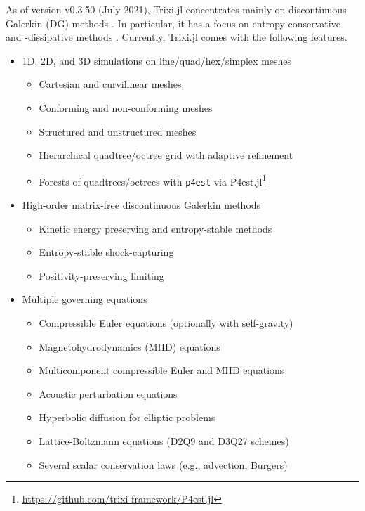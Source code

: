 \documentclass{juliacon}
\makeatletter
\newcommand{\eg}[0]{{e.g.\@}\xspace}
\newcommand{\trixi}{Trixi.jl\xspace}
\makeatother
\begin{document}
As of version v0.3.50 (July 2021), \trixi concentrates mainly on discontinuous
Galerkin (DG) methods \cite{hesthaven2007nodal, kopriva2009implementing}.
In particular, it has a focus on entropy-conservative and -dissipative methods
\cite{tadmor1987numerical, lefloch2002fully, fisher2013discretely,
ranocha2018comparison, chen2017entropy}. Currently, \trixi comes with the
following features.
\begin{itemize}
  \item 1D, 2D, and 3D simulations on line/quad/hex/simplex meshes
  \begin{itemize}
    \item Cartesian and curvilinear meshes
    \item Conforming and non-conforming meshes
    \item Structured and unstructured meshes
    \item Hierarchical quadtree/octree grid with adaptive refinement
    \item Forests of quadtrees/octrees with \texttt{p4est} \cite{burstedde2011p4est}
          via P4est.jl\footnote{\url{https://github.com/trixi-framework/P4est.jl}}
  \end{itemize}

  \item High-order matrix-free discontinuous Galerkin methods
  \begin{itemize}
    \item Kinetic energy preserving and entropy-stable methods
    \item Entropy-stable shock-capturing
    \item Positivity-preserving limiting
  \end{itemize}

  \item Multiple governing equations
  \begin{itemize}
    \item Compressible Euler equations (optionally with self-gravity)
    \item Magnetohydrodynamics (MHD) equations
    \item Multicomponent compressible Euler and MHD equations
    \item Acoustic perturbation equations
    \item Hyperbolic diffusion for elliptic problems
    \item Lattice-Boltzmann equations (D2Q9 and D3Q27 schemes)
    \item Several scalar conservation laws (\eg, advection, Burgers)
  \end{itemize}


\end{itemize}
\end{document}
